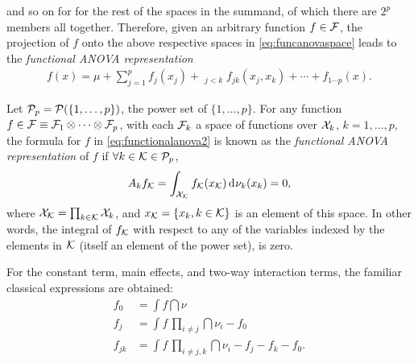 and so on for for the rest of the spaces in the summand, of which there are $2^p$ members all together. 
Therefore, given an arbitrary function $f\in{\mathcal F}$, the projection of $f$ onto the above respective 
spaces in \cref{eq:funcanovaspace} leads to the \emph{functional ANOVA representation}
\begin{align}\label{eq:functionalanova2}
  f(x) = \mu + \sum_{j=1}^p f_j(x_j) + \mathop{\sum_{j,k=1}^p}_{j<k} f_{jk}(x_j,x_k) + \cdots + f_{1\cdots p}(x).
\end{align}

\begin{definition}
  Let ${\mathcal P}_p = {\mathcal P}(\{1,\dots,p\})$, the power set of $\{1,\dots,p\}$.
  For any function $f \in {\mathcal F}\equiv{\mathcal F}_1\otimes\cdots\otimes{\mathcal F}_p$, with each ${\mathcal F}_k$ a space of functions over ${\mathcal X}_k$, $k=1,\dots,p$, the formula for $f$ in \cref{eq:functionalanova2} is known as the \emph{functional ANOVA representation} of $f$ if $\forall k \in {\mathcal K} \in {\mathcal P}_p$,
  \begin{align}\label{eq:funcanovaorth}
    A_k f_{\mathcal K} = \int_{{\mathcal X}_{\mathcal K}} f_{\mathcal K}(x_{\mathcal K}) \operatorname{d}\hspace{0.5pt}\!\nu_k(x_k) = 0,
  \end{align}
  where ${\mathcal X}_{\mathcal K} = \prod_{k\in{\mathcal K}} {\mathcal X}_k$, and $x_{\mathcal K} = \{x_k, k \in {\mathcal K} \}$ is an element of this space.
  In other words, the integral of $f_{\mathcal K}$ with respect to any of the variables indexed by the elements in ${\mathcal K}$ (itself an element of the power set), is zero. 
\end{definition}

For the constant term, main effects, and two-way interaction terms, the familiar classical expressions are obtained:
\begin{align*}
  f_0 &= \int f \dint\nu \\
  f_j &= \int f \, \textstyle\prod_{i\neq j} \dint\nu_i  - f_0 \\
  f_{jk} &= \int f \, \textstyle\prod_{i\neq j,k} \dint\nu_i  - f_j - f_k - f_0.
\end{align*}


